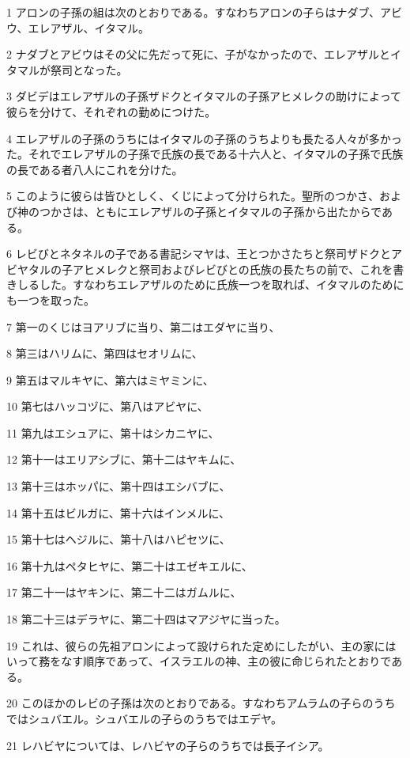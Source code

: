 \par 1 アロンの子孫の組は次のとおりである。すなわちアロンの子らはナダブ、アビウ、エレアザル、イタマル。
\par 2 ナダブとアビウはその父に先だって死に、子がなかったので、エレアザルとイタマルが祭司となった。
\par 3 ダビデはエレアザルの子孫ザドクとイタマルの子孫アヒメレクの助けによって彼らを分けて、それぞれの勤めにつけた。
\par 4 エレアザルの子孫のうちにはイタマルの子孫のうちよりも長たる人々が多かった。それでエレアザルの子孫で氏族の長である十六人と、イタマルの子孫で氏族の長である者八人にこれを分けた。
\par 5 このように彼らは皆ひとしく、くじによって分けられた。聖所のつかさ、および神のつかさは、ともにエレアザルの子孫とイタマルの子孫から出たからである。
\par 6 レビびとネタネルの子である書記シマヤは、王とつかさたちと祭司ザドクとアビヤタルの子アヒメレクと祭司およびレビびとの氏族の長たちの前で、これを書きしるした。すなわちエレアザルのために氏族一つを取れば、イタマルのためにも一つを取った。
\par 7 第一のくじはヨアリブに当り、第二はエダヤに当り、
\par 8 第三はハリムに、第四はセオリムに、
\par 9 第五はマルキヤに、第六はミヤミンに、
\par 10 第七はハッコヅに、第八はアビヤに、
\par 11 第九はエシュアに、第十はシカニヤに、
\par 12 第十一はエリアシブに、第十二はヤキムに、
\par 13 第十三はホッパに、第十四はエシバブに、
\par 14 第十五はビルガに、第十六はインメルに、
\par 15 第十七はヘジルに、第十八はハピセツに、
\par 16 第十九はペタヒヤに、第二十はエゼキエルに、
\par 17 第二十一はヤキンに、第二十二はガムルに、
\par 18 第二十三はデラヤに、第二十四はマアジヤに当った。
\par 19 これは、彼らの先祖アロンによって設けられた定めにしたがい、主の家にはいって務をなす順序であって、イスラエルの神、主の彼に命じられたとおりである。
\par 20 このほかのレビの子孫は次のとおりである。すなわちアムラムの子らのうちではシュバエル。シュバエルの子らのうちではエデヤ。
\par 21 レハビヤについては、レハビヤの子らのうちでは長子イシア。
